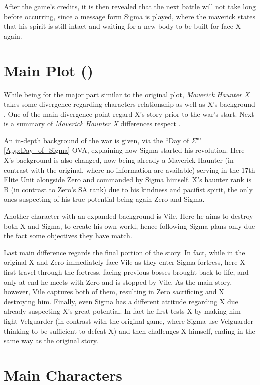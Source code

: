After the game's credits, it is then revealed that the next battle will not take long before occurring, since a message form Sigma is played, where the maverick states that his spirit is still intact and waiting for a new body to be built for face X again.
\section{Main Plot (\mhx)}
While being for the major part similar to the original plot, \textit{Maverick Haunter X} takes some divergence regarding characters relationship as well as X's background \cite{wiki:MM_MHX}. One of the main divergence point regard X's story prior to the war's start. Next is a summary of \textit{Maverick Haunter X} differences respect \x.

An in-depth background of the war is given, via the ``Day of $\Sigma$""\ref{App:Day_of_Sigma} OVA, explaining how Sigma started his revolution. Here X's background is also changed, now being already a Maverick Haunter (in contrast with the original, where no information are available) serving in the 17th Elite Unit alongside Zero and commanded by Sigma himself. X's haunter rank is B (in contrast to Zero's SA rank) due to his kindness and pacifist spirit, the only ones suspecting of his true potential being again Zero and Sigma. 

Another character with an expanded background is Vile. Here he aims to destroy both X and Sigma, to create his own world, hence following Sigma plans only due the fact some objectives they have match.

Last main difference regards the final portion of the story\cite{wiki:MM_MHX_script}. In fact, while in the original X and Zero immediately face Vile as they enter Sigma fortress, here X first travel through the fortress, facing previous bosses brought back to life, and only at end he meets with Zero and is stopped by Vile. As the main story, however, Vile captures both of them, resulting in Zero sacrificing and X destroying him. Finally, even Sigma has a different attitude regarding X due already suspecting X's great potential. In fact he first tests X by making him fight Velguarder (in contrast with the original game, where Sigma use Velguarder thinking to be sufficient to defeat X) and then challenges X himself, ending in the same way as the original story.	

\section{Main Characters}

